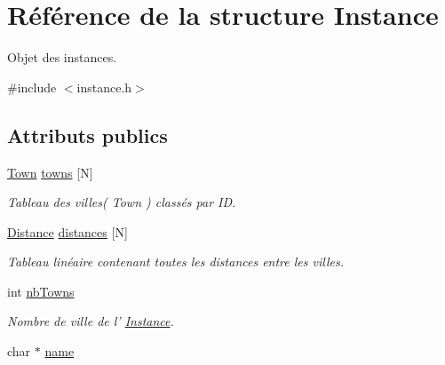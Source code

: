 \hypertarget{structInstance}{
\section{Référence de la structure Instance}
\label{structInstance}
}


Objet des instances.  




{\ttfamily \#include $<$instance.h$>$}

\subsection*{Attributs publics}
\begin{DoxyCompactItemize}
\item 
\hypertarget{structInstance_a2087c5ae925e10c023ab75ae949b3a8c}{
\hyperlink{structTown}{Town} \hyperlink{structInstance_a2087c5ae925e10c023ab75ae949b3a8c}{towns} \mbox{[}N\mbox{]}}
\label{structInstance_a2087c5ae925e10c023ab75ae949b3a8c}

\begin{DoxyCompactList}\small\item\em Tableau des villes( Town ) classés par ID. \item\end{DoxyCompactList}\item 
\hypertarget{structInstance_a4737b2c817f2a1d43e15c370dbdd10b2}{
\hyperlink{structDistance}{Distance} \hyperlink{structInstance_a4737b2c817f2a1d43e15c370dbdd10b2}{distances} \mbox{[}N\mbox{]}}
\label{structInstance_a4737b2c817f2a1d43e15c370dbdd10b2}

\begin{DoxyCompactList}\small\item\em Tableau linéaire contenant toutes les distances entre les villes. \item\end{DoxyCompactList}\item 
\hypertarget{structInstance_aef5e944d6f236c31f03a4a9886e8ab99}{
int \hyperlink{structInstance_aef5e944d6f236c31f03a4a9886e8ab99}{nbTowns}}
\label{structInstance_aef5e944d6f236c31f03a4a9886e8ab99}

\begin{DoxyCompactList}\small\item\em Nombre de ville de l' \hyperlink{structInstance}{Instance}. \item\end{DoxyCompactList}\item 
\hypertarget{structInstance_a7822b9a12232dac563bd744f399cae76}{
char $\ast$ \hyperlink{structInstance_a7822b9a12232dac563bd744f399cae76}{name}}
\label{structInstance_a7822b9a12232dac563bd744f399cae76}


\end{DoxyCompactItemize}
